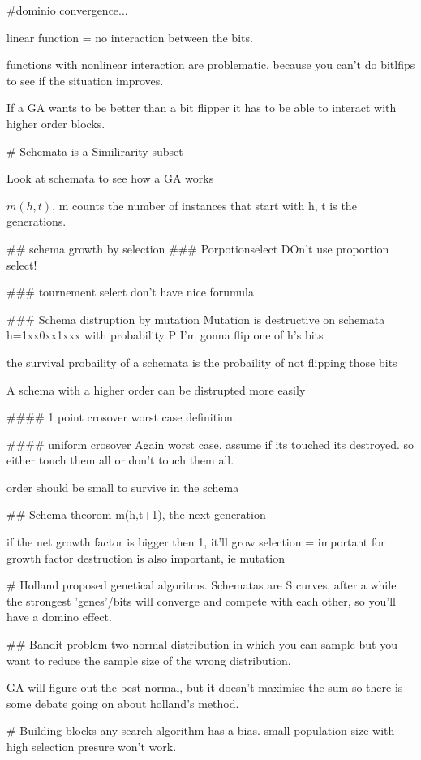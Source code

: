 #dominio convergence...

linear function = no interaction between the bits.

functions with nonlinear interaction are problematic, because
you can't do bitlfips to see if the situation improves.

If a GA wants to be better than a bit flipper it has to be able to
interact with higher order blocks.

# Schemata
is a  Similirarity subset

Look at schemata to see how a GA works

$m(h, t)$, m counts the number of instances that start with h, t is the
generations.

## schema growth by selection
### Porpotionselect
DOn't use proportion select!

### tournement select
don't have nice forumula

### Schema distruption by mutation
Mutation is destructive on schemata
h=1xx0xx1xxx
with probability P I'm gonna flip one of h's bits

the survival probaility of a schemata is the probaility of not flipping
those bits

A schema with a higher order can be distrupted more easily

#### 1 point crosover
worst case definition.


#### uniform crosover
Again worst case, assume if its touched its destroyed.
so either touch them all or don't touch them all.

order should be small to survive in the schema

## Schema theorom
m(h,t+1), the next generation

if the net growth factor is bigger then 1, it'll grow
selection = important for growth factor
destruction is also important, ie mutation

# Holland
proposed genetical algoritms.
Schematas are S curves, after a while the strongest 'genes'/bits will converge
and compete with each other, so you'll have a domino effect.

## Bandit problem
two normal distribution in which you can sample but you want to reduce
the sample size of the wrong distribution.

GA will figure out the best normal, but it doesn't maximise the sum
so there is some debate going on about holland's method.

# Building blocks
any search algorithm has a bias.
small population size with high selection presure won't work.


